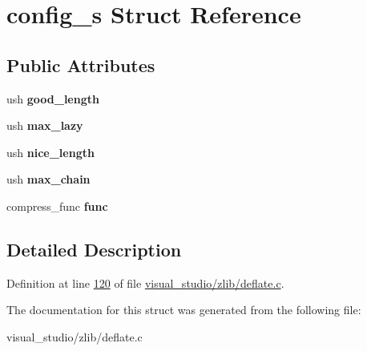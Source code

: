 \hypertarget{structconfig__s}{}\section{config\+\_\+s Struct Reference}
\label{structconfig__s}
\subsection*{Public Attributes}
\begin{DoxyCompactItemize}
\item 
\mbox{\label{structconfig__s_a36152319fbe49bebbc0354f8bcb617a6}} 
ush {\bfseries good\+\_\+length}
\item 
\mbox{\label{structconfig__s_afecf50eeeb2afca11ab28d344280231b}} 
ush {\bfseries max\+\_\+lazy}
\item 
\mbox{\label{structconfig__s_af2a1e023e10d6e0c9ff64f8c0c4c9894}} 
ush {\bfseries nice\+\_\+length}
\item 
\mbox{\label{structconfig__s_ac0ef64600cf4487e3754a21934ffdb89}} 
ush {\bfseries max\+\_\+chain}
\item 
\mbox{\label{structconfig__s_aea5a0fe31d694079966523a49d60174b}} 
compress\+\_\+func {\bfseries func}
\end{DoxyCompactItemize}


\subsection{Detailed Description}


Definition at line \hyperlink{visual__studio_2zlib_2deflate_8c_source_l00120}{120} of file \hyperlink{visual__studio_2zlib_2deflate_8c_source}{visual\+\_\+studio/zlib/deflate.\+c}.



The documentation for this struct was generated from the following file\+:\begin{DoxyCompactItemize}
\item 
visual\+\_\+studio/zlib/deflate.\+c\end{DoxyCompactItemize}
